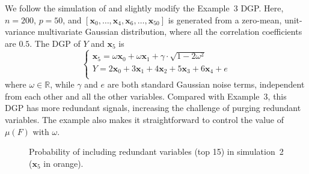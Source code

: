 \documentclass[11pt,review,authoryear]{elsarticle}
\begin{document}
\smallskip
We follow the simulation of \citet{zhaoyu06} and slightly modify the Example~3 DGP. Here, $n = 200$, $p = 50$, and $[\mathbf{x}_0, \ldots, \mathbf{x}_4, \mathbf{x}_6, \ldots, \mathbf{x}_{50}]$ is generated from a zero-mean, unit-variance multivariate Gaussian distribution, where all the correlation coefficients are $0.5$. The DGP of $Y$ and $\mathbf{x}_5$ is
\begin{equation}
	\begin{cases}
    \mathbf{x}_5 = \omega \mathbf{x}_0 + \omega \mathbf{x}_1 + \gamma\cdot \sqrt{1 - 2\omega^2} \\
    Y = 2 \mathbf{x}_0 + 3\mathbf{x}_1 + 4 \mathbf{x}_2 + 5 \mathbf{x}_3 + 6 \mathbf{x}_4 + e \\
	\end{cases}
	\label{eqn:dgp_x5}
\end{equation}
%
where $\omega \in \mathbb{R}$, while $\gamma$ and $e$ are both standard Gaussian noise terms, independent from each other and all the other variables. Compared with Example~3, this DGP has more redundant signals, increasing the challenge of purging redundant variables. The example also makes it straightforward to control the value of $\mu \left( F \right)$ with $\omega$.

\begin{figure}
  \centering

  \caption{Probability of including redundant variables (top 15) in simulation~2 ($\mathbf{x}_5$ in orange).}
  \label{fig:solar_ic_type-II}
\end{figure}
\end{document}
